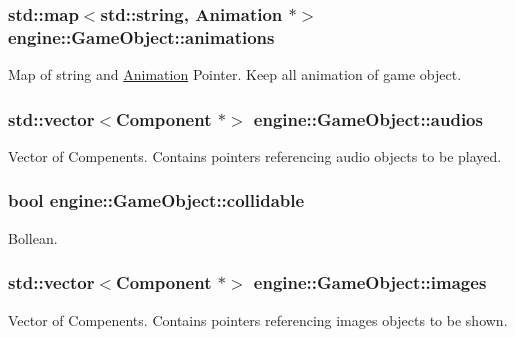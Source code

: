 \subsubsection[{\texorpdfstring{animations}{animations}}]{\setlength{\rightskip}{0pt plus 5cm}std\+::map$<$std\+::string, {\bf Animation} $\ast$$>$ engine\+::\+Game\+Object\+::animations}\hypertarget{classengine_1_1_game_object_a5cb70de44e18b89e4d298de907f1668a}{}\label{classengine_1_1_game_object_a5cb70de44e18b89e4d298de907f1668a}
Map of string and \hyperlink{classengine_1_1_animation}{Animation} Pointer. Keep all animation of game object. 
\subsubsection[{\texorpdfstring{audios}{audios}}]{\setlength{\rightskip}{0pt plus 5cm}std\+::vector$<${\bf Component} $\ast$$>$ engine\+::\+Game\+Object\+::audios}\hypertarget{classengine_1_1_game_object_a1466e1d3fa4d30de06df15791d15cbc7}{}\label{classengine_1_1_game_object_a1466e1d3fa4d30de06df15791d15cbc7}
Vector of Compenents. Contains pointers referencing audio objects to be played. 
\subsubsection[{\texorpdfstring{collidable}{collidable}}]{\setlength{\rightskip}{0pt plus 5cm}bool engine\+::\+Game\+Object\+::collidable}\hypertarget{classengine_1_1_game_object_a1044128797889af9aee10599b09174ed}{}\label{classengine_1_1_game_object_a1044128797889af9aee10599b09174ed}
Bollean. 
\subsubsection[{\texorpdfstring{images}{images}}]{\setlength{\rightskip}{0pt plus 5cm}std\+::vector$<${\bf Component} $\ast$$>$ engine\+::\+Game\+Object\+::images}\hypertarget{classengine_1_1_game_object_af79b2f893d53454481d085825e4898c8}{}\label{classengine_1_1_game_object_af79b2f893d53454481d085825e4898c8}
Vector of Compenents. Contains pointers referencing images objects to be shown. 
